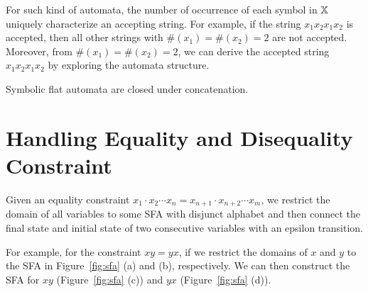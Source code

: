 \documentclass{llncs}
\begin{document}
For such kind of automata, the number of occurrence of each symbol in $\mbox{$\mathbb{X}$}$ uniquely characterize an accepting string. For example, if the string $x_1x_2x_1x_2$ is accepted, then all other strings with $\#(x_1)=\#(x_2)=2$ are not accepted. Moreover, from $\#(x_1)=\#(x_2)=2$, we can derive the accepted string $x_1x_2x_1x_2$ by exploring the automata structure. 

\begin{lemma}
	Symbolic flat automata are closed under concatenation.
\end{lemma}






\section{Handling Equality and Disequality Constraint} \label{section:eq}
Given an equality constraint $x_1\cdot x_2 \cdots x_n = x_{n+1}\cdot x_{n+2} \cdots x_m$, we restrict the domain of all variables to some SFA with disjunct alphabet and then connect the final state and initial state of two consecutive variables with an epsilon transition. 

For example, for the constraint $xy = yx$, if we restrict the domains of $x$ and $y$ to the SFA in Figure~\ref{fig:sfa} (a) and (b), respectively. We can then construct the SFA for $xy$ (Figure~\ref{fig:sfa} (c)) and $yx$ (Figure~\ref{fig:sfa} (d)).
\end{document}
